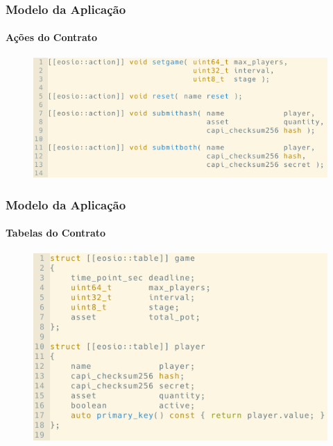 \documentclass[11pt, red]{beamer}
\begin{document}
\begin{frame}
    \frametitle{Modelo da Aplica\c{c}\~ao}
    \framesubtitle{A\c{c}\~oes do Contrato}
    \begin{figure}[htb]\label{ex1}
        \begin{center}
            \includegraphics[width=0.8\linewidth]{fig/contract3.png}
        \end{center}
    \end{figure}
\end{frame}

\begin{frame}
    \frametitle{Modelo da Aplica\c{c}\~ao}
    \framesubtitle{Tabelas do Contrato}
    \begin{figure}[htb]\label{ex1}
        \begin{center}
            \includegraphics[width=0.7\linewidth]{fig/contract4.png}
        \end{center}
    \end{figure}
\end{frame}
\end{document}
